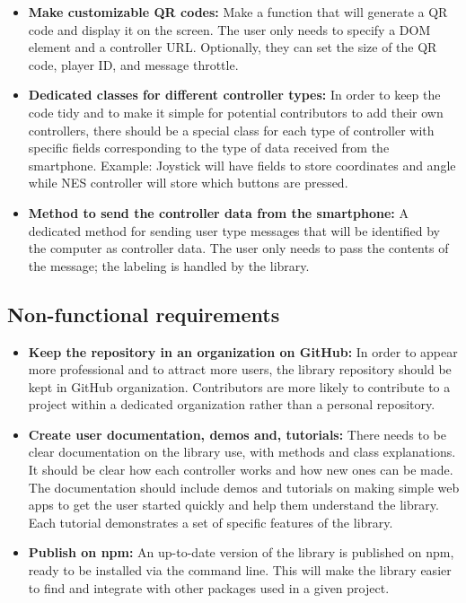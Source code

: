 \documentclass{l4proj}
\begin{document}
\begin{itemize}
  \item \textbf{Make customizable QR codes:} Make a function that will generate a QR code and display it on the screen. The user only needs to specify a DOM element and a controller URL. Optionally, they can set the size of the QR code, player ID, and message throttle. 
  
  \item \textbf{Dedicated classes for different controller types:} In order to keep the code tidy and to make it simple for potential contributors to add their own controllers, there should be a special class for each type of controller with specific fields corresponding to the type of data received from the smartphone. Example: Joystick will have fields to store coordinates and angle while NES controller will store which buttons are pressed. 
  
  \item \textbf{Method to send the controller data from the smartphone:} A dedicated method for sending user type messages that will be identified by the computer as controller data. The user only needs to pass the contents of the message; the labeling is handled by the library.
  

  
  
\end{itemize}
\subsection{Non-functional requirements} 
\setlength\itemsep{1em}
\begin{itemize}
  \item\textbf{ Keep the repository in an organization on GitHub:} In order to appear more professional and to attract more users, the library repository should be kept in GitHub organization. Contributors are more likely to contribute to a project within a dedicated organization rather than a personal repository.
  
  \item \textbf{Create user documentation, demos and, tutorials:} There needs to be clear documentation on the library use, with methods and class explanations. It should be clear how each controller works and how new ones can be made. The documentation should include demos and tutorials on making simple web apps to get the user started quickly and help them understand the library. Each tutorial demonstrates a set of specific features of the library. 
  
  \item \textbf{Publish on npm:} An up-to-date version of the library is published on npm, ready to be installed via the command line. This will make the library easier to find and integrate with other packages used in a given project. 
  
\end{itemize}
\end{document}
